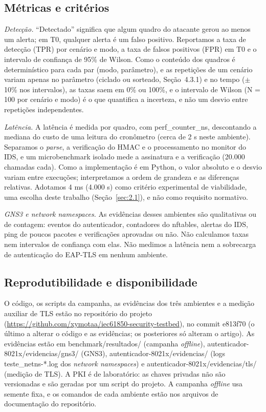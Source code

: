 \documentclass[12pt]{article}
\begin{document}
\subsection{Métricas e critérios}\label{sec:4.4}

\emph{Detecção.} \textquotedblleft{}Detectado\textquotedblright{} significa que algum quadro do atacante gerou ao menos um alerta; em T0, qualquer alerta é um falso positivo. Reportamos a taxa de detecção (TPR) por cenário e modo, a taxa de falsos positivos (FPR) em T0 e o intervalo de confiança de 95\% de Wilson. Como o conteúdo dos quadros é determinístico para cada par (modo, parâmetro), e as repetições de um cenário variam apenas no parâmetro (ciclado ou sorteado, Seção~4.3.1) e no tempo (\ensuremath{\pm}10\% nos intervalos), as taxas saem em 0\% ou 100\%, e o intervalo de Wilson (N = 100 por cenário e modo) é o que quantifica a incerteza, e não um desvio entre repetições independentes.

\emph{Latência.} A latência é medida por quadro, com perf\_\allowbreak{}counter\_\allowbreak{}ns, descontando a mediana do custo de uma leitura do cronômetro (cerca de 2 \textmu{}s neste ambiente). Separamos o \emph{parse}, a verificação do HMAC e o processamento no monitor do IDS, e um microbenchmark isolado mede a assinatura e a verificação (20.000 chamadas cada). Como a implementação é em Python, o valor absoluto e o desvio variam entre execuções; interpretamos a ordem de grandeza e as diferenças relativas. Adotamos 4 ms (4.000 \textmu{}s) como critério experimental de viabilidade, uma escolha deste trabalho (Seção~\ref{sec:2.1}), e não como requisito normativo.

\emph{GNS3 e network namespaces.} As evidências desses ambientes são qualitativas ou de contagem: eventos do autenticador, contadores do nftables, alertas do IDS, ping de poucos pacotes e verificações aprovadas ou não. Não calculamos taxas nem intervalos de confiança com elas. Não medimos a latência nem a sobrecarga de autenticação do EAP-TLS em nenhum ambiente.

\subsection{Reprodutibilidade e disponibilidade}\label{sec:4.5}

O código, os scripts da campanha, as evidências dos três ambientes e a medição auxiliar de TLS estão no repositório do projeto (\url{https://github.com/xymotaa/iec61850-security-testbed}), no commit e813f70 (o último a alterar o código e as evidências; os posteriores só alteram o artigo). As evidências estão em benchmark/\allowbreak{}resultados/\allowbreak{} (campanha \emph{offline}), autenticador-8021x/\allowbreak{}evidencias/\allowbreak{}gns3/\allowbreak{} (GNS3), autenticador-8021x/\allowbreak{}evidencias/\allowbreak{} (logs teste\_\allowbreak{}netns-*.\allowbreak{}log dos \emph{network namespaces}) e autenticador-8021x/\allowbreak{}evidencias/\allowbreak{}tls/\allowbreak{} (medição de TLS). A PKI é de laboratório: as chaves privadas não são versionadas e são geradas por um script do projeto. A campanha \emph{offline} usa semente fixa, e os comandos de cada ambiente estão nos arquivos de documentação do repositório.
\end{document}
